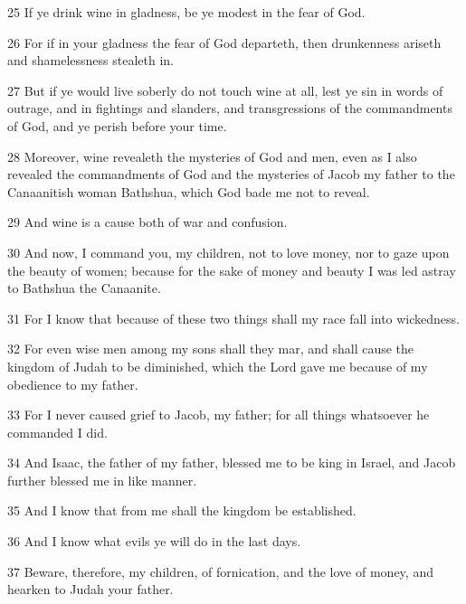 \par 25 If ye drink wine in gladness, be ye modest in the fear of God.

\par 26 For if in your gladness the fear of God departeth, then drunkenness ariseth and shamelessness stealeth in.

\par 27 But if ye would live soberly do not touch wine at all, lest ye sin in words of outrage, and in fightings and slanders, and transgressions of the commandments of God, and ye perish before your time.

\par 28 Moreover, wine revealeth the mysteries of God and men, even as I also revealed the commandments of God and the mysteries of Jacob my father to the Canaanitish woman Bathshua, which God bade me not to reveal.

\par 29 And wine is a cause both of war and confusion.

\par 30 And now, I command you, my children, not to love money, nor to gaze upon the beauty of women; because for the sake of money and beauty I was led astray to Bathshua the Canaanite.

\par 31 For I know that because of these two things shall my race fall into wickedness.

\par 32 For even wise men among my sons shall they mar, and shall cause the kingdom of Judah to be diminished, which the Lord gave me because of my obedience to my father.

\par 33 For I never caused grief to Jacob, my father; for all things whatsoever he commanded I did.

\par 34 And Isaac, the father of my father, blessed me to be king in Israel, and Jacob further blessed me in like manner.

\par 35 And I know that from me shall the kingdom be established.

\par 36 And I know what evils ye will do in the last days.

\par 37 Beware, therefore, my children, of fornication, and the love of money, and hearken to Judah your father.

